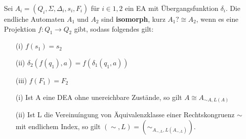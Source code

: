   Sei \(A_{i} = (Q_{i}, \Sigma, \Delta_{i}, s_{i}, F_{i})\) für \(i \in {1,2}\) ein EA mit Übergangsfunktion \(\delta_{i}\). Die endliche Automaten \(A_{1}\) und \(A_{2}\) sind \textbf{isomorph}, kurz \(A_{1}? \cong A_{2}\), wenn es eine Projektion \(f:Q_{1}\rightarrow Q_{2}\) gibt, sodass folgendes gilt:
  \begin{itemize}
    \item [(i)] \(f(s_{1}) = s_{2}\)
    \item [(ii)] \(\delta_{2}(f(q_{1}), a) = f(\delta_{1}(q_{1}, a))\)
    \item [(iii)] \(f(F_1) = F_2\)
  \end{itemize}

  \begin{itemize}
    \item [(i)] Ist A eine DEA ohne unereichbare Zustände, so gilt \(A \cong A_{\sim A, L(A)}\)
    \item [(ii)] Ist L die Vereinuíngung von Äquivalenzklasse einer Rechtskongruenz \(\sim\) mit endlichem Index, so gilt \((\sim, L) = (\sim_{A_{\sim, L}, L(A_{\sim, L})})\).
  \end{itemize}

